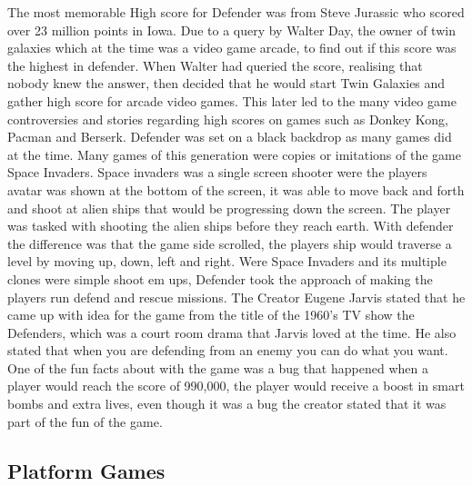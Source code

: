 \documentclass{article}
\begin{document}
The most memorable High score for Defender was from Steve Jurassic who scored over 23 million points in Iowa. Due to a query by Walter Day, the owner of twin galaxies which at the time was a video game arcade, to find out if this score was the highest in defender. When Walter had queried the score, realising that nobody knew the answer, then decided that he would start Twin Galaxies and gather high score for arcade video games. This later led to the many video game controversies and stories regarding high scores on games such as Donkey Kong, Pacman and Berserk. \newline
Defender was set on a black backdrop as many games did at the time. Many games of this generation were copies or imitations of the game Space Invaders. Space invaders was a single screen shooter were the players avatar was shown at the bottom of the screen, it was able to move back and forth and shoot at alien ships that would be progressing down the screen. The player was tasked with shooting the alien ships before they reach earth. With defender the difference was that the game side scrolled, the players ship would traverse a level by moving up, down, left and right. Were Space Invaders and its multiple clones were simple shoot em ups, Defender took the approach of making the players run defend and rescue missions. The Creator Eugene Jarvis stated that he came up with idea for the game from the title of the 1960's TV show the Defenders, which was a court room drama that Jarvis loved at the time. He also stated that when you are defending from an enemy you can do what you want. One of the fun facts about with the game was a bug that happened when a player would reach the score of 990,000, the player would receive a boost in smart bombs and extra lives, even though it was a bug the creator stated that it was part of the fun of the game.
\clearpage			
\subsection{Platform Games}
\end{document}
